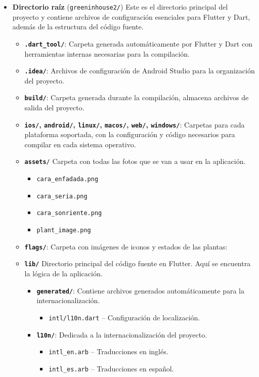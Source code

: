 \begin{itemize}
    \item {\textbf{Directorio raíz} (\texttt{greeninhouse2/})}
    Este es el directorio principal del proyecto y contiene archivos de configuración esenciales para Flutter y Dart, además de la estructura del código fuente.

    \begin{itemize}
    \item \textbf{\texttt{.dart\_tool/}}: Carpeta generada automáticamente por Flutter y Dart con herramientas internas necesarias para la compilación.
    \item \textbf{\texttt{.idea/}}: Archivos de configuración de Android Studio para la organización del proyecto.
    \item \textbf{\texttt{build/}}: Carpeta generada durante la compilación, almacena archivos de salida del proyecto.
    \item \textbf{\texttt{ios/}, \texttt{android/}, \texttt{linux/}, \texttt{macos/}, \texttt{web/}, \texttt{windows/}}: Carpetas para cada plataforma soportada, con la configuración y código necesarios para compilar en cada sistema operativo.

    \item \texttt{\textbf{assets}/} Carpeta con todas las fotos que se van a usar en la aplicación.
    \begin{itemize}
        \item \texttt{cara\_enfadada.png}
        \item \texttt{cara\_seria.png}
        \item \texttt{cara\_sonriente.png}
        \item \texttt{plant\_image.png}
    \end{itemize}
    \item \textbf{\texttt{flags/}}: Carpeta con imágenes de iconos y estados de las plantas:

    \item{\texttt{\textbf{lib/}}}
    Directorio principal del código fuente en Flutter. Aquí se encuentra la lógica de la aplicación.
    \begin{itemize}
    \item \textbf{\texttt{generated/}}: Contiene archivos generados automáticamente para la internacionalización.
    \begin{itemize}
        \item \texttt{intl/l10n.dart} – Configuración de localización.
    \end{itemize}
    \item \textbf{\texttt{l10n/}}: Dedicada a la internacionalización del proyecto.
    \begin{itemize}
        \item \texttt{intl\_en.arb} – Traducciones en inglés.
        \item \texttt{intl\_es.arb} – Traducciones en español.
    \end{itemize}


\end{itemize}
\end{itemize}
\end{itemize}
